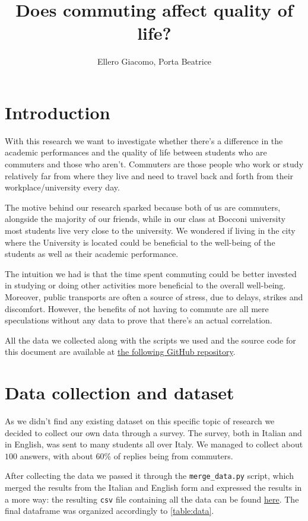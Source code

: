 \documentclass[11pt]{extarticle}
\title{\vspace{-1.5cm}Does commuting affect quality of life?\vspace{-0.5cm}}
\author{Ellero Giacomo, Porta Beatrice}
\date{}
\numberwithin{table}{section}
\numberwithin{figure}{section}
\numberwithin{equation}{section}
\begin{document}
\maketitle
\vspace{-1cm}

\section{Introduction}

With this research we want to investigate whether there’s a difference in the academic performances
and the quality of life between students who are commuters and those who aren't.
Commuters are those people who work or study relatively far from where they live
and need to travel back and forth from their workplace/university every day.

The motive behind our research sparked because both of us are commuters,
alongside the majority of our friends, while in our class at Bocconi university most students
live very close to the university.
We wondered if living in the city where the University is located could be beneficial
to the well-being of the students as well as their academic performance.

The intuition we had is that the time spent commuting could be better invested in studying
or doing other activities more beneficial to the overall well-being.
Moreover, public transports are often a source of stress, due to delays, strikes and discomfort.
However, the benefits of not having to commute are all mere speculations without any data to prove
that there’s an actual correlation.

All the data we collected along with the scripts we used and the source code for this document
are available at
\href{https://github.com/billy4479/stats-research-project}{the following GitHub repository}.

\section{Data collection and dataset}

As we didn't find any existing dataset on this specific topic of research we decided
to collect our own data through a survey.
The survey, both in Italian and in English, was sent to many students all over Italy.
We managed to collect about $100$ answers, with about $60\%$ of replies being from commuters.

After collecting the data we passed it through the \texttt{merge\_data.py} script,
which merged the results from the Italian and English form and expressed the results in a more
 way:
the resulting \texttt{csv} file containing all the data can be found
\href{https://github.com/billy4479/stats-research-project/blob/master/data/merged.csv}{here}.
The final dataframe was organized accordingly to \cref{table:data}.
\end{document}

